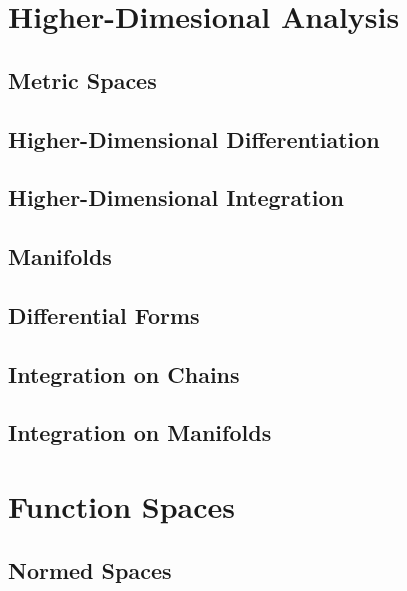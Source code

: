 \documentclass[12pt, a4paper, oneside, openright, titlepage]{book}
\begin{document}
\part{Higher-Dimesional Analysis}


\chapter{Metric Spaces}

\chapter{Higher-Dimensional Differentiation}


\chapter{Higher-Dimensional Integration}



\chapter{Manifolds}



\chapter{Differential Forms}


\chapter{Integration on Chains}


\chapter{Integration on Manifolds}


\part{Function Spaces}


\chapter{Normed Spaces}
\end{document}
